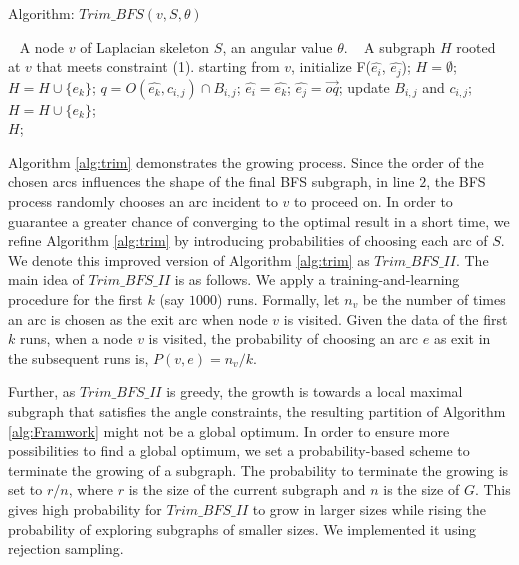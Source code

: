 \begin{algorithm}[t]
\caption{Algorithm: $Trim\_BFS(v, S,\theta)$}
\label{alg:trim}
\begin{algorithmic}[1]
\REQUIRE~
A node $v$ of Laplacian skeleton $S$, an angular value $\theta$.
\ENSURE~
 A subgraph $H$ rooted at $v$ that meets constraint (1).
\STATE starting from $v$, initialize F($\hat{e_i}$, $\hat{e_j}$); $H = \emptyset $;
  \STATE  $H = H \cup \{e_k\}$;
  \STATE $q = O( \hat{e_k}, c_{i,j}) \cap B_{i,j}$;
  \STATE  $\hat{e_i}=  \hat{e_k}$;
  \STATE $\hat{e_j} =  \overrightarrow{oq}$;
  \STATE  update $B_{i,j}$ and $c_{i,j}$;
  \STATE  $H = H \cup \{e_k\}$;
  \ENDIF
\ENDWHILE
\label{code:fram:select} \\
\RETURN  $H$;
\end{algorithmic}
\end{algorithm}

Algorithm \ref{alg:trim} demonstrates the growing process. Since the order of the chosen arcs influences the shape of the final BFS subgraph, in line $2$, the BFS process randomly chooses an arc incident to $v$ to proceed on. In order to guarantee a greater chance of converging to the optimal result in a short time, we refine Algorithm \ref{alg:trim} by introducing probabilities of choosing each arc of $S$. We denote this improved version of Algorithm \ref{alg:trim} as \textbf{$Trim\_BFS\_II$}. The main idea of $Trim\_BFS\_II$ is as follows.
We apply a training-and-learning procedure for the first $k$ (say $1000$) runs. Formally, let $n_v$ be the number of times an arc is chosen as the exit arc when node $v$ is visited. Given the data of the first $k$ runs, when a node $v$ is visited, the probability of choosing an arc $e$ as exit in the subsequent runs is, $P(v, e) = n_v/k$.


Further, as $Trim\_BFS\_II$ is greedy, the growth is towards a local maximal subgraph that satisfies the angle constraints, the resulting partition of Algorithm \ref{alg:Framwork} might not be a global optimum. In order to ensure more possibilities to find a global optimum, we set a probability-based scheme to terminate the growing of a subgraph. The probability to terminate the growing is set to $r/n$, where $r$ is the size of the current subgraph and $n$ is the size of $G$. This gives high probability for $Trim\_BFS\_II$ to grow in larger sizes while rising the probability of exploring subgraphs of smaller sizes. We implemented it using rejection sampling.

